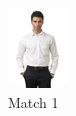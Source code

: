 \begin{figure}[H]
\begin{subfigure}[b]{0.19\textwidth}
      \includegraphics[width=\textwidth]{images/2output4.jpeg}
      \caption{Match 1}
  \end{subfigure}
  \begin{subfigure}[b]{0.19\textwidth}

\end{subfigure}
\end{figure}
